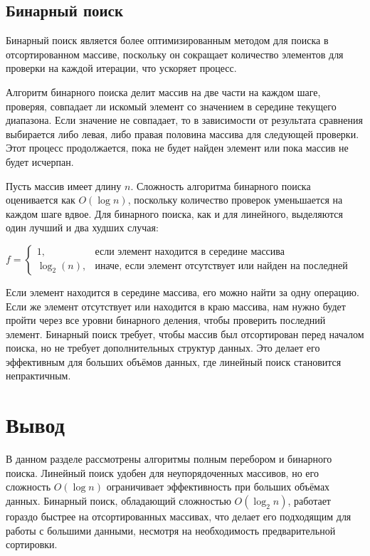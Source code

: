 \documentclass[a4paper, 12pt]{extreport}
\begin{document}
\subsection{Бинарный поиск}
Бинарный поиск является более оптимизированным методом для поиска в отсортированном массиве, поскольку он сокращает количество элементов для проверки на каждой итерации, что ускоряет процесс.

Алгоритм бинарного поиска делит массив на две части на каждом шаге, проверяя, совпадает ли искомый элемент со значением в середине текущего диапазона. Если значение не совпадает, то в зависимости от результата сравнения выбирается либо левая, либо правая половина массива для следующей проверки. Этот процесс продолжается, пока не будет найден элемент или пока массив не будет исчерпан.

Пусть массив имеет длину $n$. Сложность алгоритма бинарного поиска оценивается как $O(\log n)$, поскольку количество проверок уменьшается на каждом шаге вдвое. Для бинарного поиска, как и для линейного, выделяются один лучший и два худших случая:

\begin{equation}
    \label{eq:search_case_average}
    f = 
    \begin{cases}
      1, & \text{если элемент находится в середине массива} \\ 
      \log_2(n), & \text{иначе, если элемент отсутствует или найден на последней проверке}
    \end{cases} 
\end{equation}

Если элемент находится в середине массива, его можно найти за одну операцию. Если же элемент отсутствует или находится в краю массива, нам нужно будет пройти через все уровни бинарного деления, чтобы проверить последний элемент.
Бинарный поиск требует, чтобы массив был отсортирован перед началом поиска, но не требует дополнительных структур данных. Это делает его эффективным для больших объёмов данных, где линейный поиск становится непрактичным.

\section*{Вывод}
В данном разделе рассмотрены алгоритмы полным перебором и бинарного поиска. Линейный поиск удобен для неупорядоченных массивов, но его сложность $O(\log n)$ ограничивает эффективность при больших объёмах данных. Бинарный поиск, обладающий сложностью $O(\log_2 n)$, работает гораздо быстрее на отсортированных массивах, что делает его подходящим для работы с большими данными, несмотря на необходимость предварительной сортировки.
\end{document}
